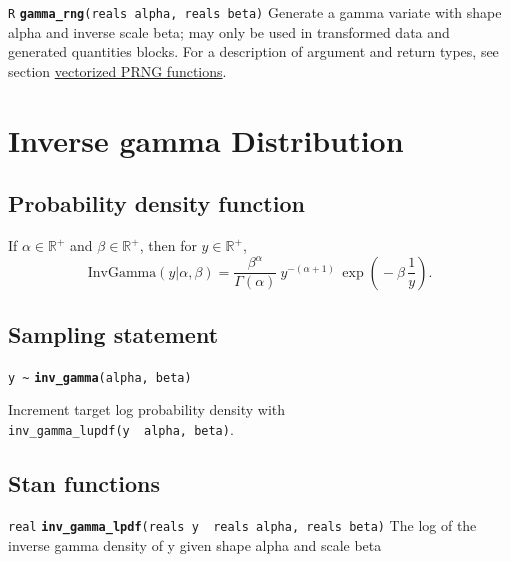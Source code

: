 \documentclass[
  10pt,
]{book}
\begin{document}

\texttt{R} \textbf{\texttt{gamma\_rng}}\texttt{(reals\ alpha,\ reals\ beta)}\newline
Generate a gamma variate with shape alpha and inverse scale beta; may
only be used in transformed data and generated quantities blocks.
For a description of argument and return types, see section
\protect\hyperlink{prng-vectorization}{vectorized PRNG functions}.

\hypertarget{inverse-gamma-distribution}{%
\section{Inverse gamma Distribution}\label{inverse-gamma-distribution}}

\hypertarget{probability-density-function-14}{%
\subsection{Probability density function}\label{probability-density-function-14}}

If \(\alpha \in \mathbb{R}^+\) and \(\beta \in \mathbb{R}^+\), then for \(y \in \mathbb{R}^+\), \[ \text{InvGamma}(y|\alpha,\beta) =
\frac{\beta^{\alpha}}      {\Gamma(\alpha)} \ y^{-(\alpha + 1)} \,
\exp \! \left( \! - \beta \, \frac{1}{y} \right) . \]

\hypertarget{sampling-statement-38}{%
\subsection{Sampling statement}\label{sampling-statement-38}}

\texttt{y\ \textasciitilde{}} \textbf{\texttt{inv\_gamma}}\texttt{(alpha,\ beta)}

Increment target log probability density with \texttt{inv\_gamma\_lupdf(y\ \textbar{}\ alpha,\ beta)}.

\hypertarget{stan-functions-37}{%
\subsection{Stan functions}\label{stan-functions-37}}


\texttt{real} \textbf{\texttt{inv\_gamma\_lpdf}}\texttt{(reals\ y\ \textbar{}\ reals\ alpha,\ reals\ beta)}\newline
The log of the inverse gamma density of y given shape alpha and scale
beta
\end{document}
